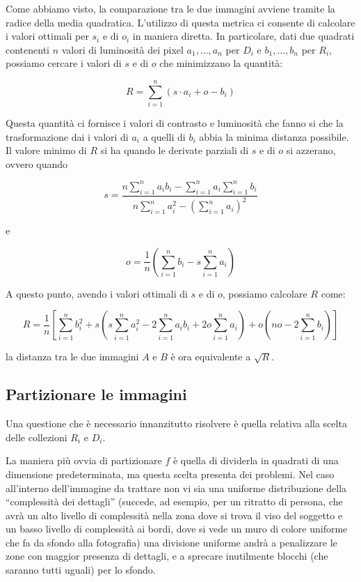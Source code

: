 \documentclass[11pt,a4paper,appendixprefix=true,numbers=noenddot]{scrreprt}
\begin{document}
Come abbiamo visto, la comparazione tra le due immagini avviene tramite la radice della media quadratica. L'utilizzo di questa metrica ci consente di calcolare i valori ottimali per $s_i$ e di $o_i$ in maniera diretta. In particolare, dati due quadrati contenenti $n$ valori di luminosità dei pixel $a_1, \dots, a_n$ per $D_i$ e $b_1, \dots, b_n$ per $R_i$, possiamo cercare i valori di $s$ e di $o$ che minimizzano la quantità:

\[
R = \sum_{i=1}^{n}{\left( s \cdot a_i + o - b_i \right) }
\]

Questa quantità ci fornisce i valori di contrasto e luminosità che fanno si che la trasformazione dai i valori di $a_i$  a quelli di $b_i$ abbia la minima distanza possibile. Il valore minimo di $R$ si ha quando le derivate parziali di $s$ e di $o$ si azzerano, ovvero quando

\[
s = \dfrac{ n \sum\limits_{i=1}^{n}{a_i b_i} - \sum\limits_{i=1}^{n}{a_i} \sum\limits_{i=1}^{n}{b_i} }
{n \sum\limits_{i=1}^{n}{a_i^2} - {\left( \sum\limits_{i=1}^{n}{a_i} \right)}^2 }
\]

e

\[
o = \frac{1}{n} \left( \sum\limits_{i=1}^{n}{b_i} - s \sum\limits_{i=1}^{n}{a_i} \right)
\]

A questo punto, avendo i valori ottimali di $s$ e di $o$, possiamo calcolare $R$ come:

\[
R = \frac{1}{n} \left[ \sum\limits_{i=1}^{n}{b_i^2} 
+ s \left( s \sum\limits_{i=1}^{n}{a_i^2} - 2 \sum\limits_{i=1}^{n}{a_i b_i} + 2o \sum\limits_{i=1}^{n}{a_i}  \right) 
+ o \left( no - 2 \sum\limits_{i=1}^{n}{b_i} \right)  \right]
\]

la distanza tra le due immagini $A$ e $B$ è ora equivalente a $\sqrt{R}$.

\subsection*{Partizionare le immagini}

Una questione che è necessario innanzitutto risolvere è quella relativa alla scelta delle collezioni $R_i$ e $D_i$. 

La maniera più ovvia di partizionare $f$ è quella di dividerla in quadrati di una dimensione predeterminata, ma questa scelta presenta dei problemi. Nel caso all'interno dell'immagine da trattare non vi sia una uniforme distribuzione della ``complessità dei dettagli'' (succede, ad esempio, per un ritratto di persona, che avrà un alto livello di complessità nella zona dove si trova il viso del soggetto e un basso livello di complessità ai bordi, dove si vede un muro di colore uniforme che fa da sfondo alla fotografia) una divisione uniforme andrà a penalizzare le zone con maggior presenza di dettagli, e a sprecare inutilmente blocchi (che saranno tutti uguali) per lo sfondo.
\end{document}

